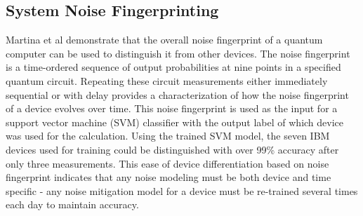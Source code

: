 \subsection{System Noise Fingerprinting}
\label{sec:martinaFingerprint}
Martina et al demonstrate that the overall noise fingerprint of a quantum computer can be used to distinguish it from other devices.
The noise fingerprint is a time-ordered sequence of output probabilities at nine points in a specified quantum circuit.
Repeating these circuit measurements either immediately sequential or with delay provides a characterization of how the noise fingerprint of a device evolves over time.
This noise fingerprint is used as the input for a support vector machine (SVM) classifier with the output label of which device was used for the calculation.
Using the trained SVM model, the seven IBM devices used for training could be distinguished with over 99\% accuracy after only three measurements.
This ease of device differentiation based on noise fingerprint indicates that any noise modeling must be both device and time specific - any noise mitigation model for a device must be re-trained several times each day to maintain accuracy.
\cite{martina_learning_2022}
